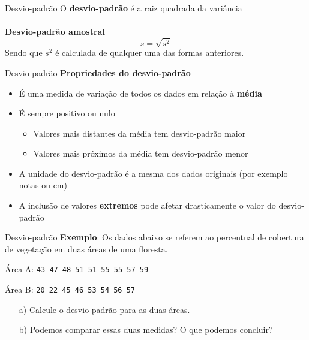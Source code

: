 \documentclass[10pt]{beamer}\usepackage[]{graphicx}\usepackage[]{color}
\theoremstyle{definition}
\begin{document}
\begin{frame}{Desvio-padrão}
  O \textbf{desvio-padrão} é a raiz quadrada da variância\\~\\
  \textbf{Desvio-padrão amostral}
  \begin{equation*}
    s = \sqrt{s^2}
  \end{equation*}
  Sendo que $s^2$ é calculada de qualquer uma das formas anteriores.
\end{frame}

\begin{frame}{Desvio-padrão}
  \textbf{Propriedades do desvio-padrão} \vspace{1em}
  \begin{itemize}
  \item É uma medida de variação de todos os dados em relação à
    \textbf{média}
  \item É sempre positivo ou nulo
    \begin{itemize}
    \item Valores mais distantes da média tem desvio-padrão maior
    \item Valores mais próximos da média tem desvio-padrão menor
    \end{itemize}
  \item A unidade do desvio-padrão é a mesma dos dados originais (por
    exemplo notas ou cm)
  \item A inclusão de valores \textbf{extremos} pode afetar
    drasticamente o valor do desvio-padrão
  \end{itemize}
\end{frame}




\begin{frame}{Desvio-padrão}
  \textbf{Exemplo}: Os dados abaixo se referem ao percentual de
  cobertura de vegetação em duas áreas de uma floresta.
  \begin{flushleft}
    Área A: \texttt{43 47 48 51 51 55 55 57 59}
  \end{flushleft}
  \begin{flushleft}
    Área B: \texttt{20 22 45 46 53 54 56 57}
  \end{flushleft}
  \begin{itemize}
  \item[a)] Calcule o desvio-padrão para as duas áreas.
  \item[b)] Podemos comparar essas duas medidas? O que podemos concluir?
  \end{itemize}
\end{frame}
\end{document}
